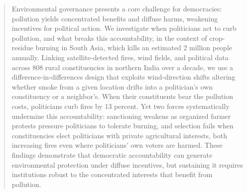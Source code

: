 \documentclass[12pt]{article}
\begin{document}
\begin{singlespace}
\begin{abstract}
Environmental governance presents a core challenge for democracies: pollution yields concentrated benefits and diffuse harms, weakening incentives for political action. We investigate when politicians act to curb pollution, and what breaks this accountability, in the context of crop-residue burning in South Asia, which kills an estimated 2 million people annually. Linking satellite-detected fires, wind fields, and political data across 808 rural constituencies in northern India over a decade, we use a difference-in-differences design that exploits wind-direction shifts altering whether smoke from a given location drifts into a politician's own constituency or a neighbor's. When their constituents bear the pollution costs, politicians curb fires by 13 percent. Yet two forces systematically undermine this accountability: sanctioning weakens as organized farmer protests pressure politicians to tolerate burning, and selection fails when constituencies elect politicians with private agricultural interests, both increasing fires even where politicians' own voters are harmed. These findings demonstrate that democratic accountability can generate environmental protection under diffuse incentives, but sustaining it requires institutions robust to the concentrated interests that benefit from pollution.




\end{abstract}

%


\end{singlespace}
\end{document}
